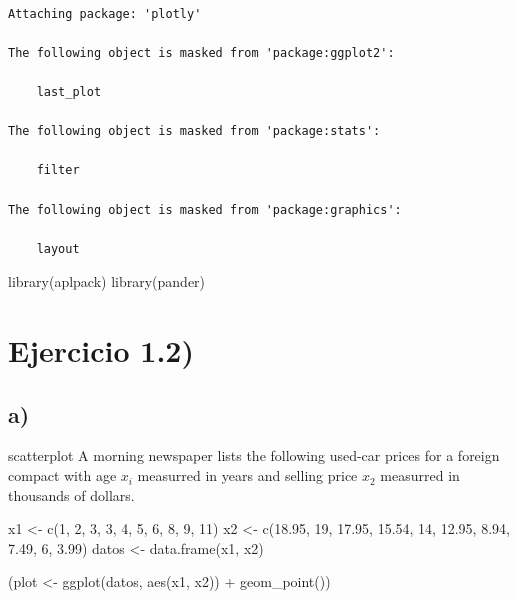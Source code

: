 \documentclass[
]{article}
\newenvironment{Shaded}{\begin{snugshade}}{\end{snugshade}}
\newcommand{\DecValTok}[1]{\textcolor[rgb]{0.00,0.00,0.81}{#1}}
\newcommand{\FloatTok}[1]{\textcolor[rgb]{0.00,0.00,0.81}{#1}}
\newcommand{\FunctionTok}[1]{\textcolor[rgb]{0.00,0.00,0.00}{#1}}
\newcommand{\NormalTok}[1]{#1}
\newcommand{\OtherTok}[1]{\textcolor[rgb]{0.56,0.35,0.01}{#1}}
\newcommand{\SpecialCharTok}[1]{\textcolor[rgb]{0.00,0.00,0.00}{#1}}
\begin{document}
\begin{verbatim}

Attaching package: 'plotly'

The following object is masked from 'package:ggplot2':

    last_plot

The following object is masked from 'package:stats':

    filter

The following object is masked from 'package:graphics':

    layout
\end{verbatim}

\begin{Shaded}
\begin{Highlighting}[]
\FunctionTok{library}\NormalTok{(aplpack)}
\FunctionTok{library}\NormalTok{(pander)}
\end{Highlighting}
\end{Shaded}

\hypertarget{ejercicio-1.2}{%
\section{Ejercicio 1.2)}\label{ejercicio-1.2}}

\hypertarget{a}{%
\subsection{a)}\label{a}}

scatterplot A morning newspaper lists the following used-car prices for
a foreign compact with age \(x_i\) measurred in years and selling price
\(x_2\) measurred in thousands of dollars.

\begin{Shaded}
\begin{Highlighting}[]
\NormalTok{x1 }\OtherTok{\textless{}{-}} \FunctionTok{c}\NormalTok{(}\DecValTok{1}\NormalTok{, }\DecValTok{2}\NormalTok{, }\DecValTok{3}\NormalTok{, }\DecValTok{3}\NormalTok{, }\DecValTok{4}\NormalTok{, }\DecValTok{5}\NormalTok{, }\DecValTok{6}\NormalTok{, }\DecValTok{8}\NormalTok{, }\DecValTok{9}\NormalTok{, }\DecValTok{11}\NormalTok{)}
\NormalTok{x2 }\OtherTok{\textless{}{-}} \FunctionTok{c}\NormalTok{(}\FloatTok{18.95}\NormalTok{, }\DecValTok{19}\NormalTok{, }\FloatTok{17.95}\NormalTok{, }\FloatTok{15.54}\NormalTok{, }\DecValTok{14}\NormalTok{, }\FloatTok{12.95}\NormalTok{, }\FloatTok{8.94}\NormalTok{, }\FloatTok{7.49}\NormalTok{, }\DecValTok{6}\NormalTok{, }\FloatTok{3.99}\NormalTok{)}
\NormalTok{datos }\OtherTok{\textless{}{-}} \FunctionTok{data.frame}\NormalTok{(x1, x2)}

\NormalTok{(plot }\OtherTok{\textless{}{-}} \FunctionTok{ggplot}\NormalTok{(datos, }\FunctionTok{aes}\NormalTok{(x1, x2)) }\SpecialCharTok{+} \FunctionTok{geom\_point}\NormalTok{())}
\end{Highlighting}
\end{Shaded}
\end{document}
